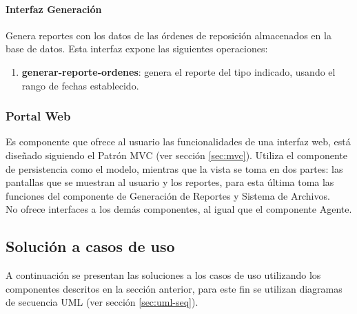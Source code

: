 \paragraph{\indent Interfaz Generación\\} Genera reportes con los datos de las órdenes de reposición almacenados en la base de datos. Esta interfaz expone las siguientes operaciones:
\begin{enumerate}
	\item \textbf{generar-reporte-ordenes}: genera el reporte del tipo indicado, usando el rango de fechas establecido.
\end{enumerate}

\subsubsection{Portal Web}
Es componente que ofrece al usuario las funcionalidades de una interfaz web, está diseñado siguiendo el Patrón MVC (ver sección \ref{sec:mvc}). Utiliza el componente de persistencia como el modelo, mientras que la vista se toma en dos partes: las pantallas que se muestran al usuario y los reportes, para esta última toma las funciones del componente de Generación de Reportes y Sistema de Archivos.\\
No ofrece interfaces a los demás componentes, al igual que el componente Agente.



\subsection{Solución a casos de uso}
A continuación se presentan las soluciones a los casos de uso utilizando los componentes descritos en la sección anterior, para este fin se utilizan diagramas de secuencia UML (ver sección \ref{sec:uml-seq}).

